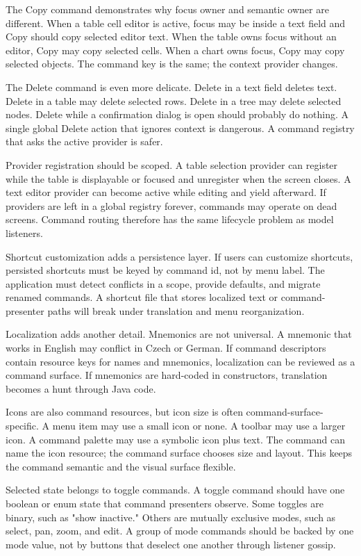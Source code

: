 The Copy command demonstrates why focus owner and semantic owner are different. When a table cell editor is active, focus may be inside a text field and Copy should copy selected editor text. When the table owns focus without an editor, Copy may copy selected cells. When a chart owns focus, Copy may copy selected objects. The command key is the same; the context provider changes.

The Delete command is even more delicate. Delete in a text field deletes text. Delete in a table may delete selected rows. Delete in a tree may delete selected nodes. Delete while a confirmation dialog is open should probably do nothing. A single global Delete action that ignores context is dangerous. A command registry that asks the active provider is safer.

Provider registration should be scoped. A table selection provider can register while the table is displayable or focused and unregister when the screen closes. A text editor provider can become active while editing and yield afterward. If providers are left in a global registry forever, commands may operate on dead screens. Command routing therefore has the same lifecycle problem as model listeners.

Shortcut customization adds a persistence layer. If users can customize shortcuts, persisted shortcuts must be keyed by command id, not by menu label. The application must detect conflicts in a scope, provide defaults, and migrate renamed commands. A shortcut file that stores localized text or command-presenter paths will break under translation and menu reorganization.

Localization adds another detail. Mnemonics are not universal. A mnemonic that works in English may conflict in Czech or German. If command descriptors contain resource keys for names and mnemonics, localization can be reviewed as a command surface. If mnemonics are hard-coded in constructors, translation becomes a hunt through Java code.

Icons are also command resources, but icon size is often command-surface-specific. A menu item may use a small icon or none. A toolbar may use a larger icon. A command palette may use a symbolic icon plus text. The command can name the icon resource; the command surface chooses size and layout. This keeps the command semantic and the visual surface flexible.

Selected state belongs to toggle commands. A toggle command should have one boolean or enum state that command presenters observe. Some toggles are binary, such as "show inactive." Others are mutually exclusive modes, such as select, pan, zoom, and edit. A group of mode commands should be backed by one mode value, not by buttons that deselect one another through listener gossip.

